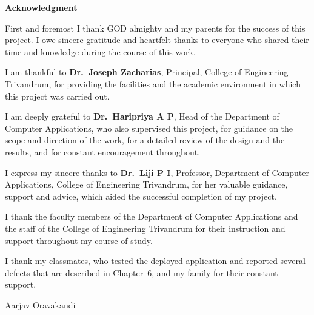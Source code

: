 \begin{center}
\vspace*{-0.55cm}
{\large\bfseries Acknowledgment\par}
\end{center}
\vspace{14pt}

First and foremost I thank GOD almighty and my parents for the success of this project. I owe sincere gratitude and heartfelt thanks to everyone who shared their time and knowledge during the course of this work.

I am thankful to \textbf{Dr.\ Joseph Zacharias}, Principal, College of Engineering Trivandrum, for providing the facilities and the academic environment in which this project was carried out.

I am deeply grateful to \textbf{Dr.\ Haripriya A P}, Head of the Department of Computer Applications, who also supervised this project, for guidance on the scope and direction of the work, for a detailed review of the design and the results, and for constant encouragement throughout.

I express my sincere thanks to \textbf{Dr.\ Liji P I}, Professor, Department of Computer Applications, College of Engineering Trivandrum, for her valuable guidance, support and advice, which aided the successful completion of my project.

I thank the faculty members of the Department of Computer Applications and the staff of the College of Engineering Trivandrum for their instruction and support throughout my course of study.

I thank my classmates, who tested the deployed application and reported several defects that are described in Chapter~6, and my family for their constant support.

\vspace{36pt}
\hfill Aarjav Oravakandi
\clearpage
